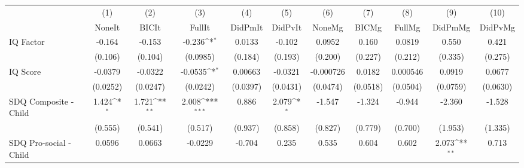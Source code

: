 {
\def\sym#1{\ifmmode^{#1}\else\(^{#1}\)\fi}
\begin{tabular}{l*{10}{c}}
\toprule
            &\multicolumn{1}{c}{(1)}&\multicolumn{1}{c}{(2)}&\multicolumn{1}{c}{(3)}&\multicolumn{1}{c}{(4)}&\multicolumn{1}{c}{(5)}&\multicolumn{1}{c}{(6)}&\multicolumn{1}{c}{(7)}&\multicolumn{1}{c}{(8)}&\multicolumn{1}{c}{(9)}&\multicolumn{1}{c}{(10)}\\
            &\multicolumn{1}{c}{NoneIt}&\multicolumn{1}{c}{BICIt}&\multicolumn{1}{c}{FullIt}&\multicolumn{1}{c}{DidPmIt}&\multicolumn{1}{c}{DidPvIt}&\multicolumn{1}{c}{NoneMg}&\multicolumn{1}{c}{BICMg}&\multicolumn{1}{c}{FullMg}&\multicolumn{1}{c}{DidPmMg}&\multicolumn{1}{c}{DidPvMg}\\
\midrule
IQ Factor   &      -0.164         &      -0.153         &      -0.236\sym{*}  &      0.0133         &      -0.102         &      0.0952         &       0.160         &      0.0819         &       0.550         &       0.421         \\
            &     (0.106)         &     (0.104)         &    (0.0985)         &     (0.184)         &     (0.193)         &     (0.200)         &     (0.227)         &     (0.212)         &     (0.335)         &     (0.275)         \\
\addlinespace
IQ Score    &     -0.0379         &     -0.0322         &     -0.0535\sym{*}  &     0.00663         &     -0.0321         &   -0.000726         &      0.0182         &    0.000546         &      0.0919         &      0.0677         \\
            &    (0.0252)         &    (0.0247)         &    (0.0242)         &    (0.0397)         &    (0.0431)         &    (0.0474)         &    (0.0518)         &    (0.0504)         &    (0.0759)         &    (0.0630)         \\
\addlinespace
SDQ Composite - Child&       1.424\sym{*}  &       1.721\sym{**} &       2.008\sym{***}&       0.886         &       2.079\sym{*}  &      -1.547         &      -1.324         &      -0.944         &      -2.360         &      -1.528         \\
            &     (0.555)         &     (0.541)         &     (0.517)         &     (0.937)         &     (0.858)         &     (0.827)         &     (0.779)         &     (0.700)         &     (1.953)         &     (1.335)         \\
\addlinespace
SDQ Pro-social - Child&      0.0596         &      0.0663         &     -0.0229         &      -0.704         &       0.235         &       0.535         &       0.604         &       0.602         &       2.073\sym{**} &       0.713         \\

\end{tabular}}
